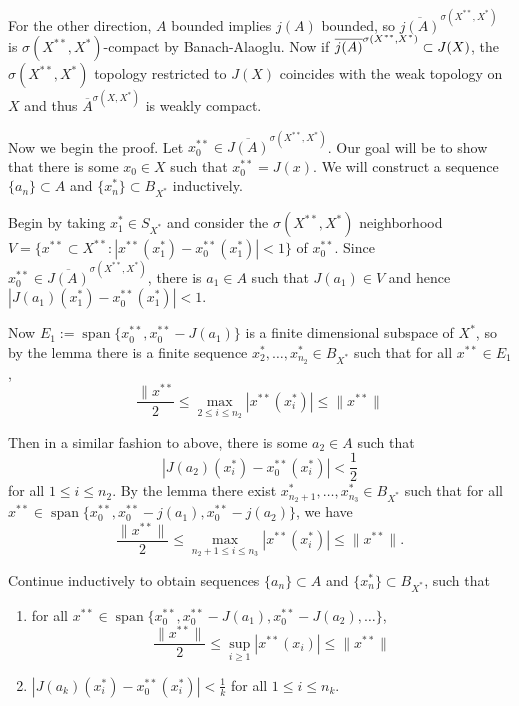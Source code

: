 \documentclass[11pt, reqno]{article}
\theoremstyle{plain}
\theoremstyle{definition}
\theoremstyle{remark}
\begin{document}
For the other direction, $A$ bounded implies $j(A)$ bounded, so $\overline{j(A)}^{\sigma(X^{**}, X^*)}$ 
is $\sigma(X^{**}, X^*)$-compact by Banach-Alaoglu. Now if $\smash{\overline{j(A)}^{\sigma(X^{**}, X^*)}}
\subset J(X)$, the $\sigma(X^{**}, X^*)$ topology restricted to $J(X)$ coincides with the weak topology on $X$
and thus $\overline{A}^{\sigma(X, X^*)}$ is weakly compact. 

Now we begin the proof. Let $x_0^{**} \in \overline{J(A)}^{\sigma(X^{**}, X^*)}$. Our goal will be to show
that there is some $x_0 \in X$ such that $x_0^{**} = J(x)$. We will construct a sequence $\{a_n\} \subset A$ and 
$\{x_n^*\} \subset B_{X^*}$ inductively. 

Begin by taking $x_1^* \in S_{X^*}$ and consider the $\sigma(X^{**}, X^*)$ neighborhood 
$V = \{x^{**} \subset X^{**}: |x^{**}(x_1^*) - x_0^{**}(x_1^*)| < 1\}$ of $x_0^{**}$. 
Since $x_0^{**} \in \overline{J(A)}^{\sigma(X^{**}, X^*)}$, there is $a_1 \in A$ such that $J(a_1) 
\in V$ and hence $|J(a_1)(x_1^*) - x_0^{**}(x_1^*)| < 1$.

Now $E_1 := \operatorname{span}\{x_0^{**}, x_0^{**} - J(a_1)\}$ is a finite dimensional subspace of $X^*$, so by the lemma
there is a finite sequence $x_2^*, \dots, x_{n_2}^* \in B_{X^*}$ such that for all $x^{**} \in E_1$, 
\[
    \frac{\|x^{**}}{2} \leq \max\limits_{2 \leq i \leq n_2} |x^{**}(x_i^*)| \leq \|x^{**}\|
\]

Then in a similar fashion to above, there is some $a_2 \in A$ such that 
\[
    \left|J(a_2)(x_i^*) - x_0^{**}(x_i^*)\right| < \frac{1}{2}
\]
for all $1 \leq i \leq n_2$. By the lemma there exist $x_{n_2 + 1}^*, \dots, x_{n_3}^* \in B_{X^*}$ such that 
for all $x^{**} \in \operatorname{span}\{x_0^{**}, x_0^{**} - j(a_1), x_0^{**} - j(a_2)\}$, we have 
\[
    \frac{\|x^{**}\|}{2} \leq \max\limits_{n_2 + 1 \leq i \leq n_3} |x^{**}(x_i^*)| \leq \|x^{**}\|.
\]

Continue inductively to obtain sequences $\{a_n\} \subset A$ and $\{x_n^*\} \subset B_{X^*}$, such that 
\begin{enumerate}
    \item for all $x^{**} \in \operatorname{span}\{x_0^{**}, x_0^{**} - J(a_1), x_0^{**} - J(a_2), \dots\}$,
    \[
        \frac{\|x^{**}\|}{2} \leq \sup\limits_{i \geq 1} |x^{**}(x_i)| \leq \|x^{**}\|
    \]

    \item $|J(a_k)(x_i^*) - x_0^{**}(x_i^*)| < \frac{1}{k}$ for all $1 \leq i \leq n_k$.
\end{enumerate}
\end{document}

